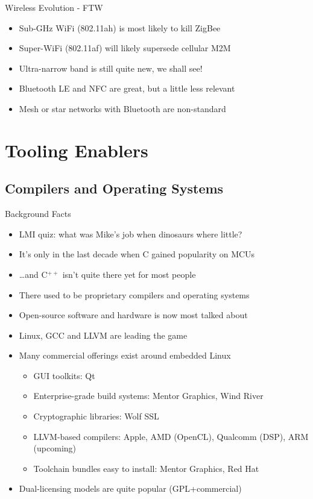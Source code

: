 \documentclass{beamer}
\begin{document}
\begin{frame}{Wireless Evolution - FTW}
\begin{itemize}
  \item Sub-GHz WiFi (802.11ah) is most likely to kill ZigBee
  \item Super-WiFi (802.11af) will likely supersede cellular M2M
  \item Ultra-narrow band is still quite new, we shall see!
  \item Bluetooth LE and NFC are great, but a little less relevant
  \item Mesh or star networks with Bluetooth are non-standard
\end{itemize}
\end{frame}

\section{Tooling Enablers}
\subsection{Compilers and Operating Systems}

\begin{frame}{Background Facts}
\begin{itemize}
  \item LMI quiz: what was Mike's job when dinosaurs where little?
  \item It's only in the last decade when C gained popularity on MCUs
  \item \dots and C$^{++}$ isn't quite there yet for most people \frownie
  \item There used to be proprietary compilers and operating systems
  \item Open-source software and hardware is now most talked about
  \item Linux, GCC and LLVM are leading the game
  \item Many commercial offerings exist around embedded Linux
  \begin{itemize}
    \item GUI toolkits: Qt
    \item Enterprise-grade build systems: Mentor Graphics, Wind River
    \item Cryptographic libraries: Wolf SSL
    \item LLVM-based compilers: Apple, AMD (OpenCL), Qualcomm (DSP), ARM (upcoming)
    \item Toolchain bundles easy to install: Mentor Graphics, Red Hat
  \end{itemize}
  \item Dual-licensing models are quite popular (GPL+commercial)
\end{itemize}
\end{frame}
\end{document}
